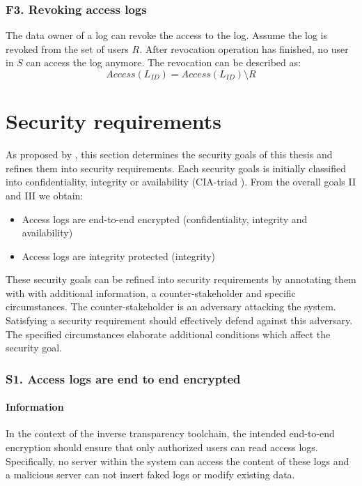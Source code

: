 \documentclass[../main.tex]{subfiles}
\begin{document}
\subsubsection{F3. Revoking access logs}
The data owner of a log can revoke the access to the log.
Assume the log is revoked from the set of users $R$.
After revocation operation has finished, no user in $S$ can access the log anymore.
The revocation can be described as:
\begin{displaymath}
    Access(L_{ID}) = Access(L_{ID}) \setminus R
\end{displaymath}

\section{Security requirements}\label{security-requriements}
As proposed by \citeauthor{Fabian2010}, this section determines the security goals of this thesis and refines them into security requirements.
Each security goals is initially classified into confidentiality, integrity or availability (CIA-triad ). 
From the overall goals II and III we obtain:
\begin{itemize}
    \item Access logs are end-to-end encrypted (confidentiality, integrity and availability)
    \item Access logs are integrity protected (integrity)
\end{itemize}

These security goals can be refined into security requirements by annotating them with with additional information, a counter-stakeholder and specific circumstances.
The counter-stakeholder is an adversary attacking the system.
Satisfying a security requirement should effectively defend against this adversary.
The specified circumstances elaborate additional conditions which affect the security goal.

\subsubsection{S1. Access logs are end to end encrypted}

\paragraph{Information}
In the context of the inverse transparency toolchain, the intended end-to-end encryption should ensure that only authorized users can read access logs.
Specifically, no server within the system can access the content of these logs and a malicious server can not insert faked logs or modify existing data.
\end{document}
